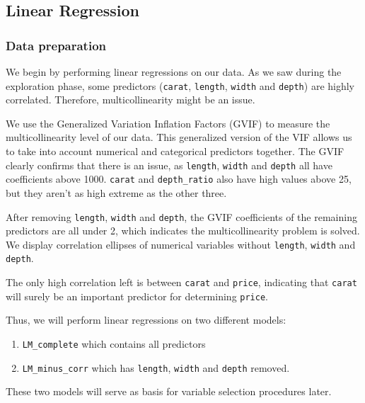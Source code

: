 \documentclass[
  paper=a4,
  ,captions=tableheading
]{scrartcl}
\providecommand{\tightlist}{%
  \setlength{\itemsep}{0pt}\setlength{\parskip}{0pt}}
\begin{document}
\hypertarget{linear-regression}{%
\subsection{Linear Regression}\label{linear-regression}}

\hypertarget{data-preparation}{%
\subsubsection{Data preparation}\label{data-preparation}}

We begin by performing linear regressions on our data. As we saw during
the exploration phase, some predictors (\texttt{carat}, \texttt{length},
\texttt{width} and \texttt{depth}) are highly correlated. Therefore,
multicollinearity might be an issue.

We use the Generalized Variation Inflation Factors (GVIF) to measure the
multicollinearity level of our data. This generalized version of the VIF
allows us to take into account numerical and categorical predictors
together. The GVIF clearly confirms that there is an issue, as
\texttt{length}, \texttt{width} and \texttt{depth} all have coefficients
above 1000. \texttt{carat} and \texttt{depth\_ratio} also have high
values above 25, but they aren't as high extreme as the other three.

After removing \texttt{length}, \texttt{width} and \texttt{depth}, the
GVIF coefficients of the remaining predictors are all under 2, which
indicates the multicollinearity problem is solved. We display
correlation ellipses of numerical variables without \texttt{length},
\texttt{width} and \texttt{depth}.

The only high correlation left is between \texttt{carat} and
\texttt{price}, indicating that \texttt{carat} will surely be an
important predictor for determining \texttt{price}.

Thus, we will perform linear regressions on two different models:

\begin{enumerate}
\def\labelenumi{\arabic{enumi}.}
\tightlist
\item
  \texttt{LM\_complete} which contains all predictors
\item
  \texttt{LM\_minus\_corr} which has \texttt{length}, \texttt{width} and
  \texttt{depth} removed.
\end{enumerate}

These two models will serve as basis for variable selection procedures
later.
\end{document}
